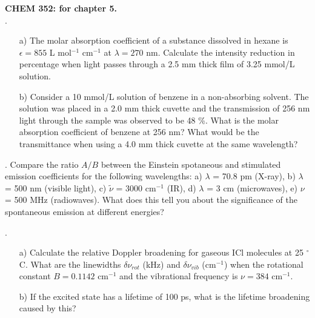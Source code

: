 \noindent
\textbf{CHEM 352:
 for chapter 5.}\\

. 
\begin{itemize}
\item[a)] The molar absorption coefficient of a substance dissolved in hexane is $\epsilon = 855$ L mol$^{-1}$ cm$^{-1}$ at $\lambda = 270$ nm. Calculate the intensity reduction in percentage when light passes through a 2.5 mm thick film of 3.25 mmol/L solution.

\item[b)] Consider a 10 mmol/L solution of benzene in a non-absorbing solvent. The solution was placed in a 2.0 mm thick cuvette and the transmission of 256 nm light through the sample was observed to be 48 \%. What is the molar absorption coefficient of benzene at 256 nm? What would be the transmittance when using a 4.0 mm thick cuvette at the same wavelength?

\end{itemize}


. Compare the ratio $A / B$ between the Einstein spotaneous and stimulated emission coefficients for the following wavelengths: a) $\lambda$ = 70.8 pm (X-ray), b) $\lambda$ = 500 nm (visible light), c) $\tilde{\nu}$ = 3000 cm$^{-1}$ (IR), d) $\lambda$ = 3 cm (microwaves), e) $\nu$ = 500 MHz (radiowaves). What does this tell you about the significance of the spontaneous emission at different energies?\\


. 

\begin{itemize}

\item[a)] Calculate the relative Doppler broadening for gaseous ICl molecules at 25 $^\circ$C. What are the linewidths $\delta\nu_{rot}$ (kHz) and $\delta\nu_{vib}$ (cm$^{-1}$) when the rotational constant $B = 0.1142$ cm$^{-1}$ and the vibrational frequency is $\nu = 384$ cm$^{-1}$.

\item[b)] If the excited state has a lifetime of 100 ps, what is the lifetime broadening caused by this?

\end{itemize}

